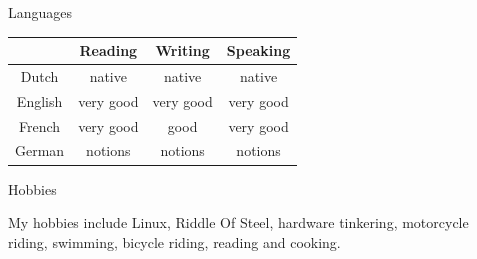 \documentclass[12pt,oneside]{article}
\makeatletter
\newenvironment{hobbies}{
	\vspace{5pt}
	{\selectfont\Large Hobbies}
	\vspace{5pt}
	\begin{flushleft}
}{
	\end{flushleft}
	\vspace{5pt}
}
\newcommand{\langhdr}{
& Reading & Writing & Speaking \\
}
\newcommand{\lang}[4]{
#1 & #2 & #3 & #4 \\
}
\newenvironment{languages}{
	\vspace{5pt}
	\begin{minipage}{\textwidth}
	{\selectfont\Large Languages} \\
	\begin{center}
	\begin{tabular*}{0.75\textwidth}{@{\extracolsep{\fill}}cccc}
	\langhdr
	\hline
}{
	\end{tabular*}
	\end{center}
	\end{minipage}
	\vspace{5pt}
}
\makeatother
\begin{document}
\begin{languages}
\lang{Dutch}{native}{native}{native}
\lang{English}{very good}{very good}{very good}
\lang{French}{very good}{good}{very good}
\lang{German}{notions}{notions}{notions}
\end{languages}

\begin{hobbies}
My hobbies include Linux, Riddle Of Steel, hardware tinkering,
motorcycle riding, swimming, bicycle riding, reading and cooking.
\end{hobbies}
\end{document}
